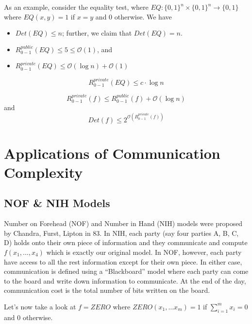 As an example, consider the equality test, where $EQ: \{0, 1\} ^n \times \{0, 1\} ^n  \rightarrow \{ 0, 1\}$ where $EQ(x, y) = 1$ if $x = y$ and $0$ otherwise. We have
\begin{itemize}
	\item $Det(EQ) \leq n$; further, we claim that $Det (EQ) = n$.
	\item $R_{0 - 1}^{public}(EQ) \leq 5 \leq \mathcal O (1)$, and 
	\item $R_{0 - 1}^{private}(EQ) \leq \mathcal O ( \log n ) + \mathcal O (1 )$
\end{itemize}

\begin{proposition}
	\begin{equation}
		R_{0-1}^{private}(EQ) \leq c \cdot \log n
	\end{equation}
\end{proposition}

\begin{theorem}
	[Newman, 91]
	\begin{equation}
		R_{0 - 1}^{private}(f) \leq R_{0-1}^{public}(f) + \mathcal O (\log n )
	\end{equation}
	and 
	\begin{equation}
		Det(f) \leq 2 ^{ \mathcal O \left( R_{0 -1}^{private} (f) \right) }
	\end{equation}
\end{theorem}

\section{Applications of Communication Complexity}
\subsection{NOF \& NIH Models}
Number on Forehead (NOF) and Number in Hand (NIH) models were proposed by Chandra, Furst, Lipton in 83. In NIH, each party (say four parties A, B, C, D) holds onto their own piece of information and they communicate and compute $f(x_1, \dots, x_4)$ which is exactly our original model. In NOF, however, each party have access to all the rest information except for their own piece. In either case, communication is defined using a ``Blackboard'' model where each party can come to the board and write down information to communicate. At the end of the day, communication cost is the total number of bits written on the board. 

Let's now take a look at $f = ZERO$ where $ZERO(x_1, \dots x_m) = 1$ if $\sum_{i = 1}^m x_i = 0$ and $0$ otherwise. 

